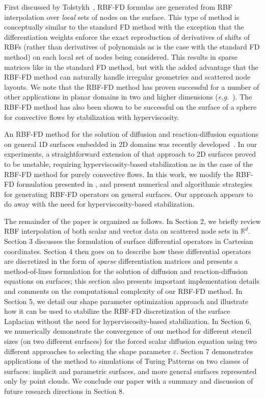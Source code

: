 \documentclass[smallextended]{svjour3}
\newcommand{\ep}{\varepsilon}
\begin{document}
First discussed by Tolstykh~\cite{Tolstykh2003}, RBF-FD formulas are generated from RBF interpolation over \emph{local} sets of nodes on the surface.  This type of method is conceptually similar to the standard FD method with the exception that the differentiation weights enforce the exact reproduction of derivatives of shifts of RBFs (rather than derivatives of polynomials as is the case with the
standard FD method) on each local set of nodes being considered. This results in sparse matrices like in the standard FD method, but with the added advantage that the RBF-FD method can naturally handle
irregular geometries and scattered node layouts. We note that the RBF-FD method has proven successful for a number of other applications in planar domains in two and higher dimensions (\emph{e.g.}~\cite{ShuDing2003,CecilQian2004,Wright200699,Chandhini2007,SPLM}). The RBF-FD method has also been shown to be successful on the surface of a sphere~\cite{FoL11,FlyerLehto2012} for convective flows by stabilization with hyperviscosity. 

An RBF-FD method for the solution of diffusion and reaction-diffusion equations on general 1D surfaces embedded in 2D domains was recently developed~\cite{ShankarWrightEtAlIJNMF2013}. In our experiments, a straightforward extension of that approach to 2D surfaces proved to be unstable, requiring hyperviscosity-based stabilization as in the case of the RBF-FD method for purely convective flows. In this work, we modify the RBF-FD formulation presented in \cite{ShankarWrightEtAlIJNMF2013}, and present numerical and algorithmic strategies for generating RBF-FD operators on general surfaces. Our approach appears to do away with the need for hyperviscosity-based stabilization. 

The remainder of the paper is organized as follows. In Section 2, we briefly review RBF interpolation of both scalar and vector data on scattered node sets in $\mathbb{R}^d$. Section 3 discusses the formulation of surface differential operators in Cartesian coordinates. Section 4 then goes on to describe how these differential operators are discretized in the form of \emph{sparse} differentiation matrices and presents a method-of-lines formulation for the solution of diffusion and reaction-diffusion equations on surfaces; this section also presents important implementation details and comments on the computational complexity of our RBF-FD method. In Section 5, we detail our shape parameter optimization approach and illustrate how it can be used to stabilize the RBF-FD discretization of the surface Laplacian without the need for hyperviscosity-based stabilization. In Section 6, we numerically demonstrate the convergence of our method for different stencil sizes (on two different surfaces) for the forced scalar diffusion equation using two different approaches to selecting the shape parameter $\ep$. Section 7 demonstrates applications of the method to simulations of Turing Patterns on two classes of surfaces: implicit and parametric surfaces, and more general surfaces represented only by point clouds. We conclude our paper with a summary and discussion of future research directions in Section 8.
\end{document}
